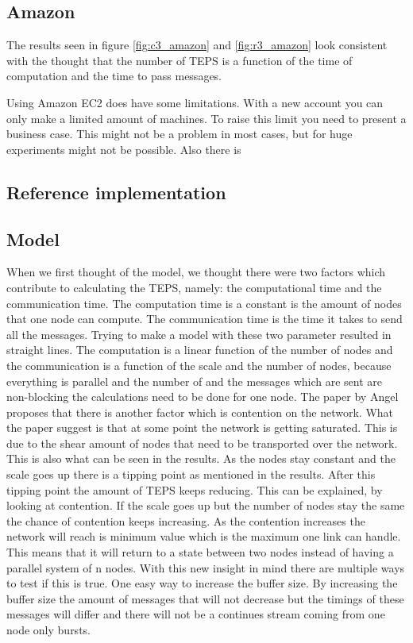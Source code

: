 \subsection{Amazon}
The results seen in figure \ref{fig:c3_amazon} and \ref{fig:r3_amazon} look consistent with the thought that the number of TEPS is a function of the time of computation and the time to pass messages.  


Using Amazon EC2 does have some limitations. With a new account you can only make a limited amount of machines. To raise this limit you need to present a business case. This might not be a problem in most cases, but for huge experiments might not be possible. Also there is 



\subsection{Reference implementation}


\subsection{Model}
When we first thought of the model, we thought there were two factors which contribute to calculating the TEPS, namely: the computational time and the communication time. The computation time is a constant is the amount of nodes that one node can compute. The communication time is the time it takes to send all the messages. Trying to make a model with these two parameter resulted in straight lines. The computation is a linear function of the number of nodes and the communication is a function of the scale and the number of nodes, because everything is parallel and the number of and the messages which are sent are non-blocking the calculations need to be done for one node. 
The paper by Angel proposes that there is another factor which is contention on the network. What the paper suggest is that at some point the network is getting saturated. This is due to the shear amount of nodes that need to be transported over the network. This is also what can be seen in the results. As the nodes stay constant and the scale goes up there is a tipping point as mentioned in the results. After this tipping point the amount of TEPS keeps reducing. This can be explained, by looking at contention. If the scale goes up but the number of nodes stay the same the chance of contention keeps increasing. As the contention increases the network will reach is minimum value which is the maximum one link can handle. This means that it will return to a state between two nodes instead of having a parallel system of n nodes.
With this new insight in mind there are multiple ways to test if this is true. One easy way to increase the buffer size. By increasing the buffer size the amount of messages that will not decrease but the timings of these messages will differ and there will not be a continues stream coming from one node only bursts.



 